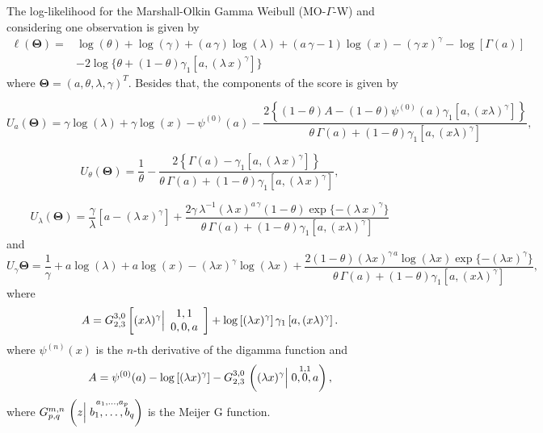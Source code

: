 \documentclass[12pt,a4paper]{article} %
\begin{document}
The log-likelihood for the Marshall-Olkin Gamma Weibull (MO-$\Gamma$-W) and considering one observation is given by
\begin{align}
\ell (\boldsymbol{\Theta})=& \log (\theta)+\log (\gamma)+(a\,\gamma)\log (\lambda)+(a\,\gamma-1)\log(x)-(\gamma\, x)^\gamma-\log[\Gamma(a)]\nonumber \\ &-2\log\{\theta+(1-\theta)\gamma_1[a,(\lambda\,x)^\gamma]\}
\end{align}
where $\boldsymbol{\Theta}=(a,\theta,\lambda,\gamma)^T$. Besides that, the components of the score is given by

\begin{equation*}
U_{a}(\boldsymbol{\Theta})=\gamma  \log (\lambda )+\gamma  \log (x)-\psi ^{(0)}(a)-\frac{2\left\{(1-\theta ) A-(1-\theta ) \psi ^{(0)}(a) \gamma_1 \left[a,(x \lambda
   )^{\gamma }\right]\right\}}{\theta\,\Gamma(a)+(1-\theta)\gamma_1\left[a,(x \lambda
   )^{\gamma }\right]},
\end{equation*}

\begin{equation*}
U_{\theta}(\boldsymbol{\Theta})=\frac{1}{\theta}-\frac{2\left\{\Gamma(a)-\gamma_1\left[a,(\lambda\,x)^\gamma\right]\right\}}{\theta\,\Gamma(a)+(1-\theta)\gamma_1\left[a,(\lambda\,x)^\gamma\right]},
\end{equation*}

\begin{equation*}
U_{\lambda}(\boldsymbol{\Theta})=\frac{\gamma }{\lambda }\left[a-(\lambda\,x)^\gamma\right]+\frac{2 \gamma \,\lambda^{-1}(\lambda\,x)^{a\,\gamma} (1-\theta )\exp\{-(\lambda\,x)^\gamma\} }{\theta \,\Gamma(a)+(1-\theta )
   \gamma_1 \left[a,(x \lambda )^{\gamma }\right]}
\end{equation*}
and
\begin{equation*}		
U_{\gamma}\boldsymbol{\Theta}=\frac{1}{\gamma }+a \log (\lambda )+a \log (x)-(\lambda  x)^{\gamma } \log
   (\lambda  x)+\frac{2 (1-\theta )(\lambda 
   x)^{\gamma\,a } \log (\lambda  x)\exp\{-(\lambda  x)^{\gamma }\}  }{\theta \,\Gamma(a)+(1-\theta )
   \gamma_1 \left[a,(x \lambda )^{\gamma }\right]},
\end{equation*}
where
\begin{align*}
A=G_{2,3}^{3,0}\left[(x \lambda )^{\gamma }\Big{|}
\begin{array}{c}
 1,1 \\
 0,0,a \\
\end{array}
\right]+\log \left[(\lambda  x)^{\gamma }\right] \gamma_1 \left[a,(x \lambda )^{\gamma
   }\right].
\end{align*}
where $\psi^{(n)}(x)$ is the $n$-th derivative of the digamma function and
\begin{eqnarray*}
A=\psi^{(0)}(a) - \log\left[(\lambda x)^{\gamma}\right]-G^{3,0}_{2,3}\,\left((\lambda x)^{\gamma} \Big{|}	\stackrel{1,1}{0,0,a}\right),
\end{eqnarray*}
where $G^{m,n}_{p,q}\,\left(z \Big{|}	\stackrel{a_{1},\ldots,a_{p}}{b_{1},\ldots,b_{q}}\right)$ is the Meijer G function.%
\end{document}
